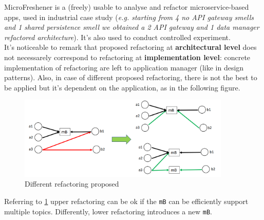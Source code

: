 \documentclass[10pt,a4paper]{report}
\begin{document}
MicroFreshener is a (freely) usable to analyse and refactor microservice-based apps, used in industrial case study (\textit{e.g. starting from 4 no API gateway smells and 1 shared persistence smell we obtained a 2 API gateway and 1 data manager refactored architecture}). It's also used to conduct controlled experiment. \\
It's noticeable to remark that proposed refactoring at \textbf{architectural level} does not necessarely correspond to refactoring at \textbf{implementation level}: concrete implementation of refactoring are left to application manager (like in design patterns). Also, in case of different proposed refactoring, there is not the best to be applied but it's dependent on the application, as in the following figure.
\begin{figure}[h]
	\centering
	\includegraphics[width=0.9\textwidth]{image72}
	\caption{Different refactoring proposed}
	\label{image72}
\end{figure} 
Referring to \ref{image72} upper refactoring can be ok if the \texttt{mB} can be efficiently support multiple topics. Differently, lower refactoring introduces a new \texttt{mB}. 
\end{document}
